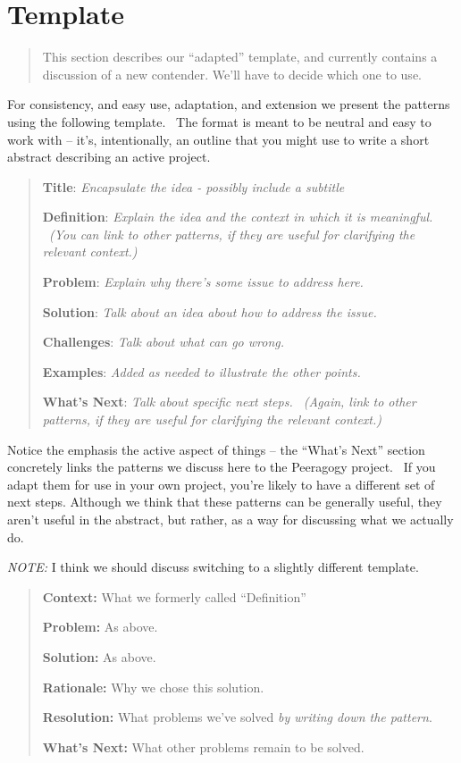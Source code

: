 \section{Template}

\begin{quote}
This section describes our ``adapted'' template, and currently contains a discussion of a new contender.  We'll have to decide which one to use.
\end{quote}

For consistency, and easy use, adaptation, and extension we present
the patterns using the following template.~ The format is meant to be
neutral and easy to work with -- it's, intentionally, an outline that
you might use to write a short abstract describing an active project.

\begin{quote}
\textbf{Title}: \emph{Encapsulate the idea - possibly include a
subtitle}

\textbf{Definition}: \emph{Explain the idea and the context in which it
is meaningful. ~(You can link to other patterns, if they are useful for
clarifying the relevant context.)}

\textbf{Problem}: \emph{Explain why there's some issue to address here.}

\textbf{Solution}: \emph{Talk about an idea about how to address the
issue.}

\textbf{Challenges}: \emph{Talk about what can go wrong.}

\textbf{Examples}: \emph{Added as needed to illustrate the other points.}

\textbf{What's Next}: \emph{Talk about specific next steps. ~(Again,
link to other patterns, if they are useful for clarifying the relevant
context.)}
\end{quote}

Notice the emphasis the active aspect of things -- the ``What's Next''
section concretely links the patterns we discuss here to the Peeragogy
project.~ If you adapt them for use in your own project, you're likely
to have a different set of next steps. Although we think that these
patterns can be generally useful, they aren't useful in the abstract,
but rather, as a way for discussing what we actually do.

\emph{NOTE:} I think we should discuss switching to a slightly
different template.

\begin{quote}
\textbf{Context:} What we formerly called ``Definition''

\textbf{Problem:} As above.

\textbf{Solution:} As above.

\textbf{Rationale:} Why we chose this solution.

\textbf{Resolution:} What problems we've solved \emph{by writing down the pattern}.

\textbf{What's Next:} What other problems remain to be solved.
\end{quote}
